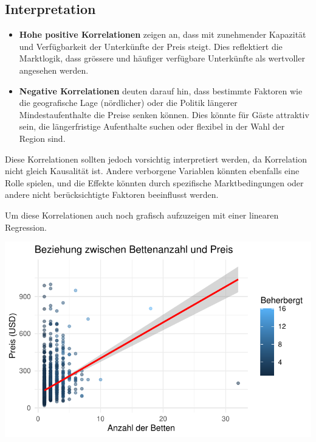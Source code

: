 \documentclass[
  journal,
]{IEEEtran}%
\begin{document}
\hypertarget{interpretation}{%
\subsection{\texorpdfstring{\textbf{Interpretation}}{Interpretation}}\label{interpretation}}

\begin{itemize}
\item
  \textbf{Hohe positive Korrelationen} zeigen an, dass mit zunehmender
  Kapazität und Verfügbarkeit der Unterkünfte der Preis steigt. Dies
  reflektiert die Marktlogik, dass grössere und häufiger verfügbare
  Unterkünfte als wertvoller angesehen werden.
\item
  \textbf{Negative Korrelationen} deuten darauf hin, dass bestimmte
  Faktoren wie die geografische Lage (nördlicher) oder die Politik
  längerer Mindestaufenthalte die Preise senken können. Dies könnte für
  Gäste attraktiv sein, die längerfristige Aufenthalte suchen oder
  flexibel in der Wahl der Region sind.
\end{itemize}

Diese Korrelationen sollten jedoch vorsichtig interpretiert werden, da
Korrelation nicht gleich Kausalität ist. Andere verborgene Variablen
könnten ebenfalls eine Rolle spielen, und die Effekte könnten durch
spezifische Marktbedingungen oder andere nicht berücksichtigte Faktoren
beeinflusst werden.

Um diese Korrelationen auch noch grafisch aufzuzeigen mit einer linearen
Regression.

\includegraphics{main_files/figure-pdf/unnamed-chunk-7-1.pdf}
\end{document}
